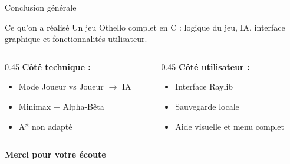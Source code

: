 \documentclass[10pt, aspectratio=169]{beamer}
\begin{document}
\begin{frame}{Conclusion générale}

   \vspace{0.3cm}

    \begin{block}{Ce qu'on a réalisé}
        Un jeu Othello complet en C : logique du jeu, IA, interface graphique et fonctionnalités utilisateur.
    \end{block}

    \vspace{0.6 cm}
    \begin{columns}[T]
        \begin{column}{0.45\textwidth}
            \textbf{Côté technique :}
            \begin{itemize}
                \item Mode Joueur vs Joueur $\rightarrow$ IA
                \item Minimax + Alpha-Bêta
                \item A* non adapté
            \end{itemize}
        \end{column}

        \begin{column}{0.45\textwidth}
            \textbf{Côté utilisateur :}
            \begin{itemize}
                \item Interface Raylib 
                \item Sauvegarde locale
                \item Aide visuelle et menu complet
            \end{itemize}
        \end{column}
    \end{columns}

    \vspace{0.7cm}

\end{frame}

\begin{frame}
    \centering
    \vspace{1cm}
    {\Huge \textcolor{DarkPink}{\textbf{Merci pour votre écoute}}}

    \vspace{1.2cm}
\end{frame}
\end{document}
